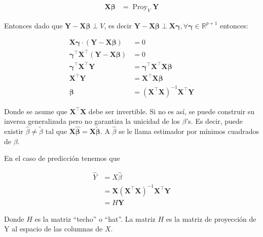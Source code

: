 \documentclass[
  12pt,
]{book}
\theoremstyle{definition}
\theoremstyle{definition}
\theoremstyle{definition}
\theoremstyle{definition}
\theoremstyle{remark}
\begin{document}
\begin{align*}
\boldsymbol{X}\boldsymbol{\beta}
 &= \operatorname{Proy}_{V} \boldsymbol{Y}
\end{align*}

Entonces dado que \(\boldsymbol{Y}-\boldsymbol{X}\boldsymbol{\beta} \perp V\), es decir \(\boldsymbol{Y}-\boldsymbol{X}\boldsymbol{\beta} \perp \boldsymbol{X}\boldsymbol{\gamma}, \forall \boldsymbol{\gamma} \in \mathbb{R}^{p+1}\) entonces:

\begin{align*}
 \boldsymbol{X}\boldsymbol{\gamma} \cdot \left(\boldsymbol{Y}-\boldsymbol{X}\boldsymbol{\beta}\right)  &=  0 \\
 \boldsymbol{\gamma}^{\top}\boldsymbol{X}^{\top}(\boldsymbol{Y}-\boldsymbol{X}\boldsymbol{\beta}) &=  0 \\
 \boldsymbol{\gamma}^{\top}\boldsymbol{X}^{\top}\boldsymbol{Y} &= \boldsymbol{\gamma}^{\top} \boldsymbol{X}^{\top} \boldsymbol{X}\boldsymbol{\beta}  \\
  \boldsymbol{X}^{\top}\boldsymbol{Y} &=  \boldsymbol{X}^{\top} \boldsymbol{X}\boldsymbol{\beta}  \\
  \boldsymbol{\beta}  &=  (\boldsymbol{X}^{\top} \boldsymbol{X})^{-1} \boldsymbol{X}^{\top}\boldsymbol{Y} 
\end{align*}

Donde se asume que \(\boldsymbol{X}^{\top} \boldsymbol{X}\) debe ser invertible. Si no es así, se puede construir su inversa generalizada pero no garantiza la unicidad de los \(\beta\)'s. Es decir, puede existir \(\hat{\beta} \neq \tilde{\beta}\) tal que \(\boldsymbol{X}\boldsymbol{\hat{\beta}} = \boldsymbol{X}\boldsymbol{\tilde{\beta}}\). A \(\hat \beta\) se le llama estimador por mínimos cuadrados de \(\beta\).

En el caso de predicción tenemos que

\begin{align*}
\hat{Y} &=  X\hat \beta \\
&= \boldsymbol{X}(\boldsymbol{X}^{\top} \boldsymbol{X})^{-1} \boldsymbol{X}^{\top}\boldsymbol{Y} \\
&=  H \boldsymbol{Y} 
\end{align*}

Donde \(H\) es la matriz ``techo'' o ``hat''. La matriz \(H\) es la matriz de proyección de Y al espacio de las columnas de \(X\).
\end{document}
